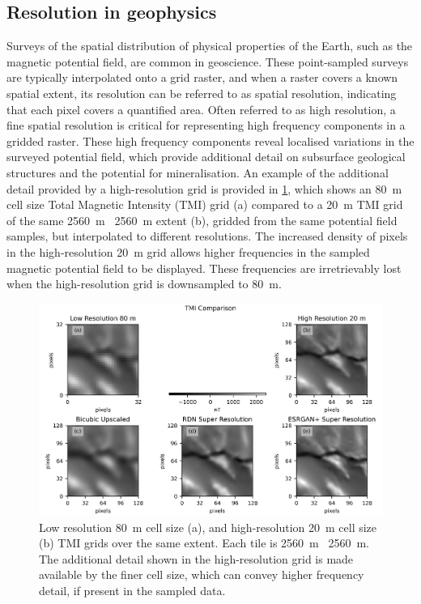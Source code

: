 \documentclass[manuscript.tex]{subfiles}
\begin{document}
\subsection{Resolution in geophysics}
\label{sec:resingeo}
Surveys of the spatial distribution of physical properties of the Earth, such as the magnetic potential field, are common in geoscience.
These point-sampled surveys are typically interpolated onto a grid raster, and when a raster covers a known spatial extent, its resolution can be referred to as spatial resolution, indicating that each pixel covers a quantified area.
Often referred to as high resolution, a fine spatial resolution is critical for representing high frequency components in a gridded raster.
These high frequency components reveal localised variations in the surveyed potential field, which provide additional detail on subsurface geological structures and the potential for mineralisation.
An example of the additional detail provided by a high-resolution grid is provided in \cref{fig:lrandhr}, which shows an \SI{80}{\metre} cell size Total Magnetic Intensity (TMI) grid (a) compared to a \SI{20}{\metre} TMI grid of the same \SI{2560}{\metre} \texttimes\ \SI{2560}{\metre} extent (b), gridded from the same potential field samples, but interpolated to different resolutions.
The increased density of pixels in the high-resolution \SI{20}{\metre} grid allows higher frequencies in the sampled magnetic potential field to be displayed.
These frequencies are irretrievably lost when the high-resolution grid is downsampled to \SI{80}{\metre}.

\begin{figure}[hbt]
    \includegraphics[width=\textwidth]{fig/p1/image1.png}
    \caption[Comparison of different resolution grids]{Low resolution \SI{80}{\metre} cell size (a), and high-resolution \SI{20}{\metre} cell size (b) TMI grids over the same extent.
        Each tile is \SI{2560}{\metre} \texttimes\ \SI{2560}{\metre}.
        The additional detail shown in the high-resolution grid is made available by the finer cell size, which can convey higher frequency detail, if present in the sampled data.}
    \label{fig:lrandhr}
\end{figure}
\end{document}
